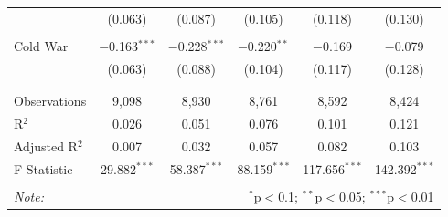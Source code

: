 \documentclass[
  12pt,
]{report}
\begin{document}
\begin{table}
{\begin{tabular}{@{\extracolsep{10pt}}lccccc}
  & (0.063) & (0.087) & (0.105) & (0.118) & (0.130) \\ 
  & & & & & \\ 
 Cold War & $-$0.163$^{***}$ & $-$0.228$^{***}$ & $-$0.220$^{**}$ & $-$0.169 & $-$0.079 \\ 
  & (0.063) & (0.088) & (0.104) & (0.117) & (0.128) \\ 
  & & & & & \\ 
\hline \\[-1.8ex] 
Observations & 9,098 & 8,930 & 8,761 & 8,592 & 8,424 \\ 
R$^{2}$ & 0.026 & 0.051 & 0.076 & 0.101 & 0.121 \\ 
Adjusted R$^{2}$ & 0.007 & 0.032 & 0.057 & 0.082 & 0.103 \\ 
F Statistic & 29.882$^{***}$ & 58.387$^{***}$ & 88.159$^{***}$ & 117.656$^{***}$ & 142.392$^{***}$ \\ 
\hline 
\hline \\[-1.8ex] 
\textit{Note:}  & \multicolumn{5}{r}{$^{*}$p$<$0.1; $^{**}$p$<$0.05; $^{***}$p$<$0.01} \\ 
\end{tabular}

}

\end{table}%
\end{document}
